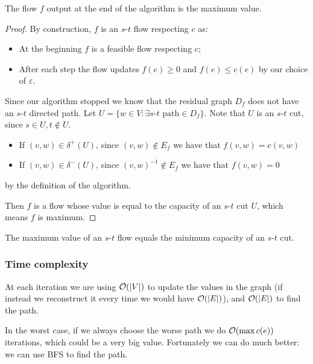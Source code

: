 \documentclass[12pt]{extarticle}
\begin{document}
\begin{theorem}
    The flow $f$ output at the end of the algorithm is the maximum value.
\end{theorem}

\begin{proof}
    By construction, $f$ is an $s$-$t$ flow respecting $c$ as:
    \begin{itemize}
        \item At the beginning $f$ is a feasible flow respecting $c$;
        \item After each step the flow updates $f(e) \geq 0$ and $f(e) \leq c(e)$ by our choice of $\varepsilon$.
    \end{itemize}

    Since our algorithm stopped we know that the residual graph $D_f$ does not have an $s$-$t$ directed path.
    Let $U = \{ w \in V: \exists s\text{-}t \text{ path} \in D_f \}$.
    Note that $U$ is an $s$-$t$ cut, since $s \in U, t \notin U$.
    \begin{itemize}
        \item If $(v, w) \in \delta^+(U)$, since $(v, w) \notin E_f$ we have that $f(v, w) = c(v, w)$
        \item If $(v, w) \in \delta^-(U)$, since $(v, w)^{-1} \notin E_f$ we have that $f(v, w) = 0$
    \end{itemize}
    by the definition of the algorithm.

    Then $f$ is a flow whose value is equal to the capacity of an $s$-$t$ cut $U$, which means $f$ is maximum.
\end{proof}

\begin{corollary}
    The maximum value of an $s$-$t$ flow equals the minimum capacity of an $s$-$t$ cut.
\end{corollary}

\subsubsection{Time complexity}
\label{sec:flow:time_complexity}

At each iteration we are using $\mathcal{O}(\abs{V})$ to update the values in the graph (if instead we reconstruct it every time we would have $\mathcal{O}(\abs{E})$), and $\mathcal{O}(\abs{E})$ to find the path.

In the worst case, if we always choose the worse path we do $\mathcal{O}(\max{c(e)})$ iterations, which could be a very big value.
Fortunately we can do much better: we can use BFS to find the path.
\end{document}

